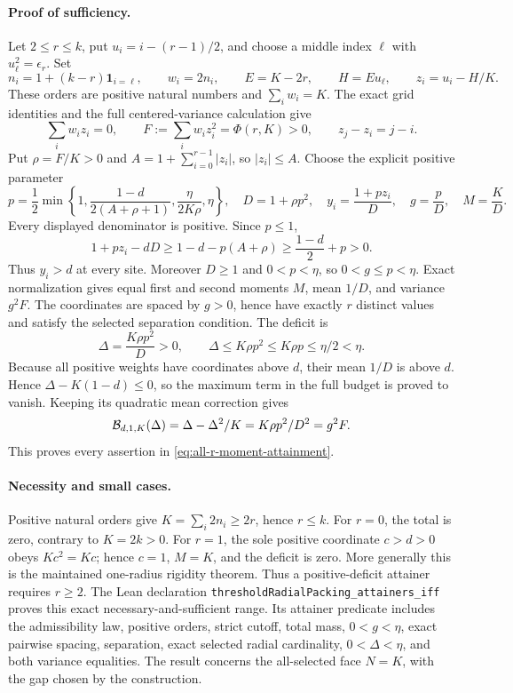 \paragraph{Proof of sufficiency.}
Let \(2\le r\le k\), put \(u_i=i-(r-1)/2\), and choose a middle
index \(\ell\) with \(u_\ell^2=\epsilon_r\). Set
\[
 n_i=1+(k-r)\mathbf1_{i=\ell},\qquad
 w_i=2n_i,\qquad E=K-2r,\qquad
 H=Eu_\ell,\qquad z_i=u_i-H/K.
\]
These orders are positive natural numbers and \(\sum_iw_i=K\).
The exact grid identities and the full centered-variance calculation give
\[
 \sum_iw_i z_i=0,\qquad
 F:=\sum_iw_i z_i^2=\Phi(r,K)>0,\qquad z_j-z_i=j-i.
\]
Put \(\rho=F/K>0\) and
\(A=1+\sum_{i=0}^{r-1}|z_i|\), so \(|z_i|\le A\).
Choose the explicit positive parameter
\[
 p=\frac12\min\left\{1,\frac{1-d}{2(A+\rho+1)},
                       \frac{\eta}{2K\rho},\eta\right\},
 \quad D=1+\rho p^2,\quad
 y_i=\frac{1+pz_i}{D},\quad
 g=\frac pD,\quad M=\frac KD.
\]
Every displayed denominator is positive. Since \(p\le1\),
\[
 1+pz_i-dD
 \ge1-d-p(A+\rho)
 \ge\frac{1-d}{2}+p>0.
\]
Thus \(y_i>d\) at every site. Moreover \(D\ge1\) and \(0<p<\eta\),
so \(0<g\le p<\eta\). Exact normalization gives equal first and
second moments \(M\), mean \(1/D\), and variance \(g^2F\).
The coordinates are spaced by \(g>0\), hence have exactly \(r\)
distinct values and satisfy the selected separation condition.
The deficit is
\[
 \Delta=\frac{K\rho p^2}{D}>0,\qquad
 \Delta\le K\rho p^2\le K\rho p\le\eta/2<\eta.
\]
Because all positive weights have coordinates above \(d\), their mean
\(1/D\) is above \(d\). Hence
\(\Delta-K(1-d)\le0\), so the maximum term in the full budget is
proved to vanish. Keeping its quadratic mean correction gives
\[
 {\cal B}_{d,1,K}(\Delta)
   =\Delta-\Delta^2/K
   =K\rho p^2/D^2
   =g^2F.
\]
This proves every assertion in \eqref{eq:all-r-moment-attainment}.

\paragraph{Necessity and small cases.}
Positive natural orders give \(K=\sum_i2n_i\ge2r\), hence \(r\le k\).
For \(r=0\), the total is zero, contrary to \(K=2k>0\).
For \(r=1\), the sole positive coordinate \(c>d>0\) obeys
\(Kc^2=Kc\); hence \(c=1\), \(M=K\), and the deficit is zero.
More generally this is the maintained one-radius rigidity theorem.
Thus a positive-deficit attainer requires \(r\ge2\).
The Lean declaration
\texttt{thresholdRadialPacking\_attainers\_iff} proves this exact
necessary-and-sufficient range. Its attainer predicate includes the
admissibility law, positive orders, strict cutoff, total mass,
\(0<g<\eta\), exact pairwise spacing, separation, exact selected
radial cardinality, \(0<\Delta<\eta\), and both variance equalities.
The result concerns the all-selected face \(N=K\), with the gap chosen
by the construction.

